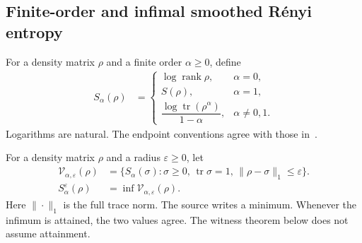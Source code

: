 \subsection{Finite-order and infimal smoothed R\'enyi entropy}

\begin{definition}
    \label{def:renyi_entropy}
    \leanok
    For a density matrix $\rho$ and a finite order $\alpha\ge0$, define
    \begin{align}
        S_\alpha(\rho) & =
        \begin{cases}
            \log\operatorname{rank}\rho, & \alpha=0,     \\
            S(\rho),                     & \alpha=1,     \\
            \dfrac{\log\operatorname{tr}(\rho^\alpha)}{1-\alpha},
                                         & \alpha\ne0,1.
        \end{cases}\label{eq:renyi_entropy_definition}
    \end{align}
    Logarithms are natural. The endpoint conventions agree with
    those in~\cite{SchuchWolfVerstraeteCirac2007}.
\end{definition}

\begin{definition}
    \label{def:infimal_smooth_renyi_entropy}
    \leanok
    For a density matrix $\rho$ and a radius $\varepsilon\ge0$, let
    \begin{align}
        \mathcal V_{\alpha,\varepsilon}(\rho)
         & =\{S_\alpha(\sigma):\sigma\ge0,\,
        \operatorname{tr}\sigma=1,\,
        \|\rho-\sigma\|_1\le\varepsilon\}.\label{eq:smooth_renyi_admissible_values}   \\
        S_\alpha^\varepsilon(\rho)
         & =\inf\mathcal V_{\alpha,\varepsilon}(\rho).\label{eq:smooth_renyi_infimum}
    \end{align}
    Here $\|\cdot\|_1$ is the full trace norm. The source
    \cite{SchuchWolfVerstraeteCirac2007} writes a minimum. Whenever the
    infimum is attained, the two values agree. The witness theorem below
    does not assume attainment.
\end{definition}

